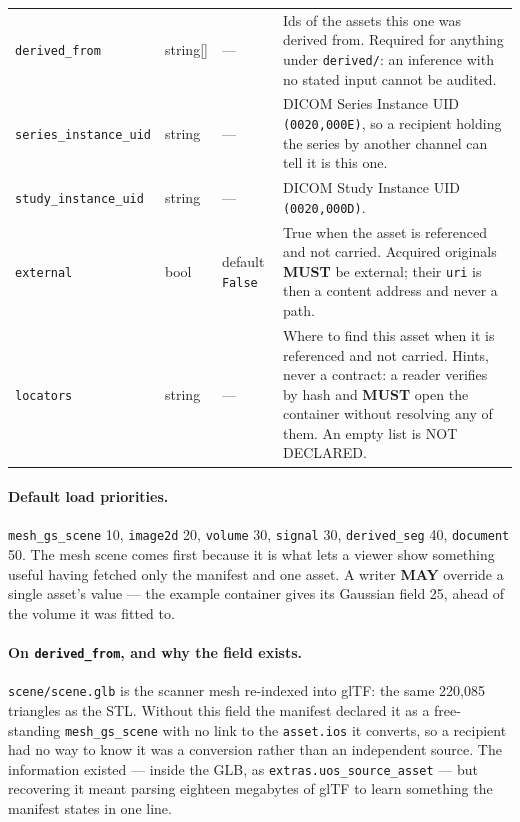 \documentclass[11pt,a4paper]{article}
\newcommand{\MUST}{\textcolor{uosred}{\textbf{MUST}}}
\newcommand{\MAY}{\textcolor{uosgreen}{\textbf{MAY}}}
\newcommand{\code}[1]{\texttt{\small #1}}
\begin{document}
\begin{longtable}{L{3.2cm} L{2.9cm} C{1.4cm} L{6.8cm}}
\code{derived\_from} & string[] & --- & Ids of the assets this one was derived from. Required for anything under \code{derived/}: an inference with no stated input cannot be audited.\\
\code{series\_instance\_uid} & string & --- & DICOM Series Instance UID \code{(0020,000E)}, so a recipient holding the series by another channel can tell it is this one.\\
\code{study\_instance\_uid} & string & --- & DICOM Study Instance UID \code{(0020,000D)}.\\
\code{external} & bool & default \code{False} & True when the asset is referenced and not carried. Acquired originals \MUST{} be external; their \code{uri} is then a content address and never a path.\\
\code{locators} & string & --- & Where to find this asset when it is referenced and not carried. Hints, never a contract: a reader verifies by hash and \MUST{} open the container without resolving any of them. An empty list is NOT DECLARED.\\
\bottomrule
\end{longtable}

\paragraph{Default load priorities.} \code{mesh\_gs\_scene} 10, \code{image2d} 20,
\code{volume} 30, \code{signal} 30, \code{derived\_seg} 40, \code{document} 50. The mesh
scene comes first because it is what lets a viewer show something useful having fetched
only the manifest and one asset. A writer \MAY{} override a single asset's value --- the
example container gives its Gaussian field 25, ahead of the volume it was fitted to.

\paragraph{On \code{derived\_from}, and why the field exists.} \code{scene/scene.glb}
is the scanner mesh re-indexed into glTF: the same 220{,}085 triangles as the STL. Without
this field the manifest declared it as a free-standing \code{mesh\_gs\_scene} with no link
to the \code{asset.ios} it converts, so a recipient had no way to know it was a conversion
rather than an independent source. The information existed --- inside the GLB, as
\code{extras.uos\_source\_asset} --- but recovering it meant parsing eighteen megabytes of
glTF to learn something the manifest states in one line.
\end{document}
